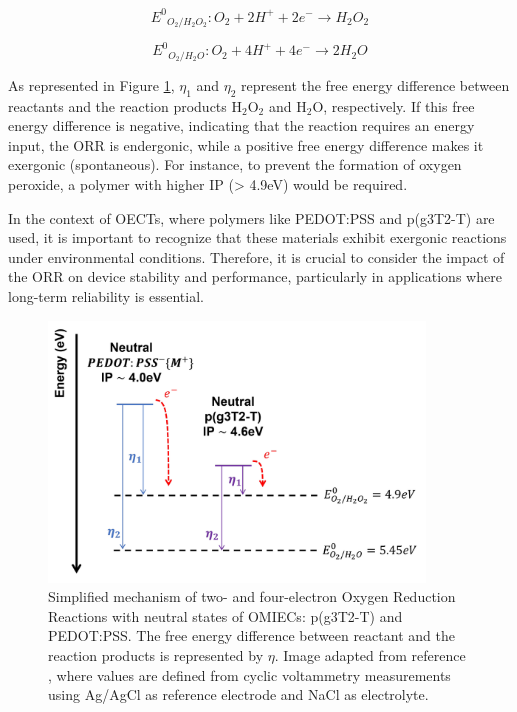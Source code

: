 


\begin{equation}\label{eq:h2o2}
	{E^{0}}_{O_{2}/H_{2}O_{2}} : O_{2} + 2H^{+} + 2e^{-} \rightarrow H_{2}O_{2}
\end{equation}

\begin{equation}\label{eq:h2o}
	{E^{0}}_{O_{2}/H_{2}O} : O_{2} + 4H^{+} + 4e^{-} \rightarrow 2H_{2}O
\end{equation}

As represented in Figure \ref{fig:orr}, $\eta_{1}$ and $\eta_{2}$ represent the free energy difference between reactants and the reaction products H$_{2}$O$_{2}$ and H$_{2}$O, respectively. If this free energy difference is negative, indicating that the reaction requires an energy input, the ORR is endergonic, while a positive free energy difference makes it exergonic (spontaneous). For instance, to prevent the formation of oxygen peroxide, a polymer with higher IP (> 4.9eV) would be required. 

In the context of OECTs, where polymers like PEDOT:PSS and p(g3T2-T) are used, it is important to recognize that these materials exhibit exergonic reactions under environmental conditions. Therefore, it is crucial to consider the impact of the ORR on device stability and performance, particularly in applications where long-term reliability is essential.

\begin{figure}[!ht]
	\centering
	\includegraphics[width=10cm]{Images/pdf/ORR.pdf}
	\caption[Energy levels of neutral state of OMIECs related to oxygen reduction reactions potentials]{Simplified mechanism of two- and four-electron Oxygen Reduction Reactions with neutral states of OMIECs: p(g3T2-T) and PEDOT:PSS. The free energy difference between reactant and the reaction products is represented by $\eta$. Image adapted from reference \cite{giovannittiEnergeticControlRedoxActive2020}, where values are defined from cyclic voltammetry measurements using Ag/AgCl as reference electrode and NaCl as electrolyte.}
	\label{fig:orr}
\end{figure}

